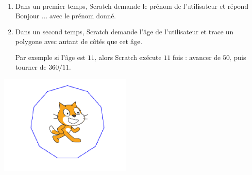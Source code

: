 \documentclass[class=report,crop=false, 12pt]{standalone}
\begin{document}
\begin{activite}
\sauteligne

\begin{enumerate}
  \item Dans un premier temps, Scratch demande le prénom de l'utilisateur et répond \og Bonjour ...\fg{} avec le prénom donné.
  
  \item Dans un second temps, Scratch demande l'âge de l'utilisateur et trace un polygone avec autant de côtés que cet âge.
  
  Par exemple si l'âge est $11$, alors Scratch exécute $11$ fois : avancer de $50$, puis tourner de $360/11$.

\end{enumerate}
\begin{center}
  \includegraphics[width=0.5\textwidth]{ecran-05-ex3} 
\end{center}


\end{activite}
\end{document}
